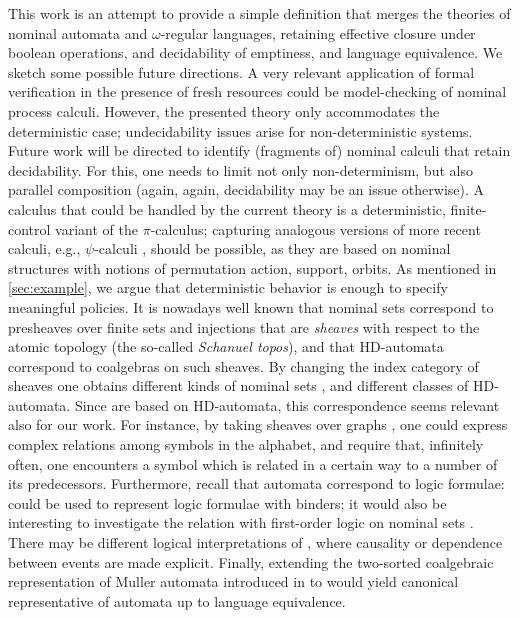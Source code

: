 This work is an attempt to provide a simple definition that merges the theories of nominal automata and $\omega$-regular languages, retaining effective closure under boolean operations, and decidability of emptiness, and language equivalence. We sketch some possible future directions. A very relevant application of formal verification in the presence of fresh resources could be model-checking of nominal process calculi. However, the presented theory only accommodates the deterministic case; undecidability issues arise for non-deterministic systems. Future work will be directed to identify (fragments of) nominal calculi that retain decidability. For this, one needs to limit not only non-determinism, but also parallel composition (again, again, decidability may be an issue otherwise). A calculus that could be handled by the current theory is a deterministic, finite-control variant of the $\pi$-calculus; capturing analogous versions of more recent calculi, e.g., $\psi$-calculi \cite{Bengtson11}, should be possible, as they are based on nominal structures with notions of permutation action, support, orbits. As mentioned in \autoref{sec:example}, we argue that deterministic behavior is enough to specify meaningful policies. It is nowadays well known that nominal sets correspond to presheaves over finite sets and injections that are \emph{sheaves} with respect to the atomic topology (the so-called \emph{Schanuel topos}), and that HD-automata correspond to coalgebras on such sheaves. By changing the index category of sheaves one obtains different kinds of nominal sets \cite{CianciaKM10}, and different classes of HD-automata. Since \hdmas{} are based on HD-automata, this correspondence seems relevant also for our work. For instance, by taking sheaves over graphs \cite{SammartinoPhD}, one could express complex relations among symbols in the alphabet, and require that, infinitely often, one encounters a symbol which is related in a certain way to a number of its predecessors. Furthermore, recall that automata correspond to logic formulae: \hdmas{} could be used to represent logic formulae with binders; it would also be interesting to investigate the relation with first-order logic on nominal sets \cite{Bojanczyk13}. There may be different logical interpretations of \hdmas, where causality or dependence \cite{Vnnen07,Galliani12} between events are made explicit. Finally, extending the two-sorted coalgebraic representation of Muller automata introduced in \cite{CV12} to \hdmas{} would yield canonical representative of automata up to language equivalence.



